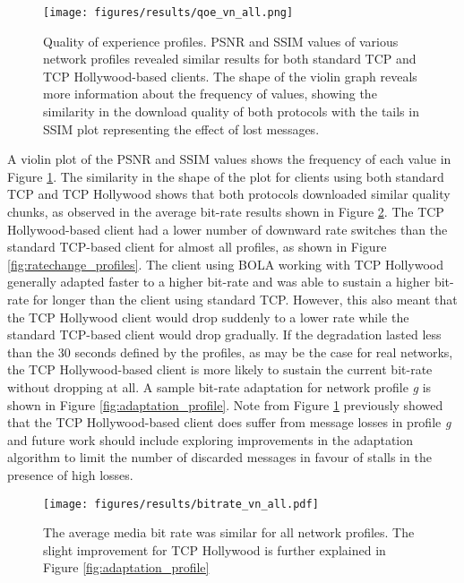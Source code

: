 \begin{figure}
  \centering
  \texttt{[image: figures/results/qoe\_vn\_all.png]}
  \caption{Quality of experience profiles. PSNR and SSIM values of various network profiles 
           revealed similar results for both standard TCP and TCP Hollywood-based clients. The 
           shape of the violin graph reveals more information about the frequency of values, 
           showing the similarity in the download quality of both protocols with the tails in 
           SSIM plot representing the effect of lost messages.}
  \label{fig:qoe_profiles}
\end{figure}

A violin plot of the PSNR and SSIM values shows the frequency of each value in Figure 
\ref{fig:qoe_profiles}. The similarity in the shape of the plot for clients using both 
standard TCP and TCP Hollywood shows that both protocols downloaded similar quality chunks, 
as observed in the average bit-rate results shown in Figure \ref{fig:rate_profiles}. The TCP Hollywood-based client had 
a lower number of downward rate switches than the standard TCP-based client for almost all 
profiles, as shown in Figure \ref{fig:ratechange_profiles}. The client using BOLA working
with TCP Hollywood generally adapted faster to a higher bit-rate and was able to sustain a
higher bit-rate for longer than the client using standard TCP. However, this also meant that 
the TCP Hollywood client would drop suddenly to a lower rate while the standard TCP-based 
client would drop
gradually. If the degradation lasted less than the 30 seconds defined by the profiles, as
may be the case for real networks, the TCP Hollywood-based client is more likely to sustain 
the current bit-rate without dropping at all. A sample bit-rate adaptation for network profile 
\emph{g} is shown in Figure \ref{fig:adaptation_profile}. Note from Figure \ref{fig:qoe_profiles}
previously showed that the TCP Hollywood-based client does suffer from message losses in profile 
\emph{g} and future work should include exploring improvements in the adaptation algorithm to 
limit the number of discarded messages in favour of stalls in the presence of high losses. 

\begin{figure}
  \centering
  \texttt{[image: figures/results/bitrate\_vn\_all.pdf]}
  \caption{The average media bit rate was similar for all network profiles. The slight improvement for TCP Hollywood is further explained in Figure \ref{fig:adaptation_profile} }
  \label{fig:rate_profiles}
\end{figure}


